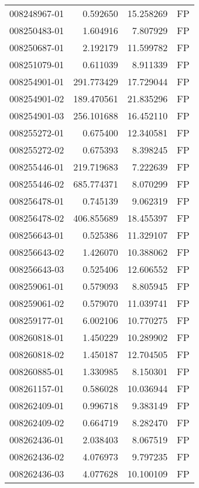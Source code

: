 \begin{tabular}{lrrl}
008248967-01 &    0.592650 &      15.258269 &   FP \\
008250483-01 &    1.604916 &       7.807929 &   FP \\
008250687-01 &    2.192179 &      11.599782 &   FP \\
008251079-01 &    0.611039 &       8.911339 &   FP \\
008254901-01 &  291.773429 &      17.729044 &   FP \\
008254901-02 &  189.470561 &      21.835296 &   FP \\
008254901-03 &  256.101688 &      16.452110 &   FP \\
008255272-01 &    0.675400 &      12.340581 &   FP \\
008255272-02 &    0.675393 &       8.398245 &   FP \\
008255446-01 &  219.719683 &       7.222639 &   FP \\
008255446-02 &  685.774371 &       8.070299 &   FP \\
008256478-01 &    0.745139 &       9.062319 &   FP \\
008256478-02 &  406.855689 &      18.455397 &   FP \\
008256643-01 &    0.525386 &      11.329107 &   FP \\
008256643-02 &    1.426070 &      10.388062 &   FP \\
008256643-03 &    0.525406 &      12.606552 &   FP \\
008259061-01 &    0.579093 &       8.805945 &   FP \\
008259061-02 &    0.579070 &      11.039741 &   FP \\
008259177-01 &    6.002106 &      10.770275 &   FP \\
008260818-01 &    1.450229 &      10.289902 &   FP \\
008260818-02 &    1.450187 &      12.704505 &   FP \\
008260885-01 &    1.330985 &       8.150301 &   FP \\
008261157-01 &    0.586028 &      10.036944 &   FP \\
008262409-01 &    0.996718 &       9.383149 &   FP \\
008262409-02 &    0.664719 &       8.282470 &   FP \\
008262436-01 &    2.038403 &       8.067519 &   FP \\
008262436-02 &    4.076973 &       9.797235 &   FP \\
008262436-03 &    4.077628 &      10.100109 &   FP \\

\end{tabular}

